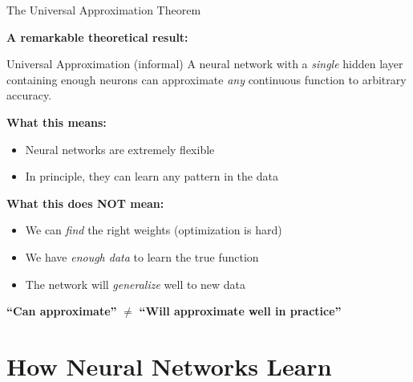 \documentclass[10pt]{beamer}
\newcommand{\highlight}[1]{\textcolor{AccentOrange}{\textbf{#1}}}
\begin{document}
\begin{frame}{The Universal Approximation Theorem}

  \textbf{A remarkable theoretical result:}

  \vspace{1em}
  \begin{block}{Universal Approximation (informal)}
    A neural network with a \textit{single} hidden layer containing enough neurons can approximate \textit{any} continuous function to arbitrary accuracy.
  \end{block}

  \vspace{1em}
  \textbf{What this means:}
  \begin{itemize}
    \item Neural networks are extremely flexible
    \item In principle, they can learn any pattern in the data
  \end{itemize}

  \vspace{1em}
  \textbf{What this does NOT mean:}
  \begin{itemize}
    \item We can \textit{find} the right weights (optimization is hard)
    \item We have \textit{enough data} to learn the true function
    \item The network will \textit{generalize} well to new data
  \end{itemize}

  \vspace{0.5em}
  \highlight{``Can approximate''} $\neq$ \highlight{``Will approximate well in practice''}
\end{frame}

\section{How Neural Networks Learn}
\end{document}
